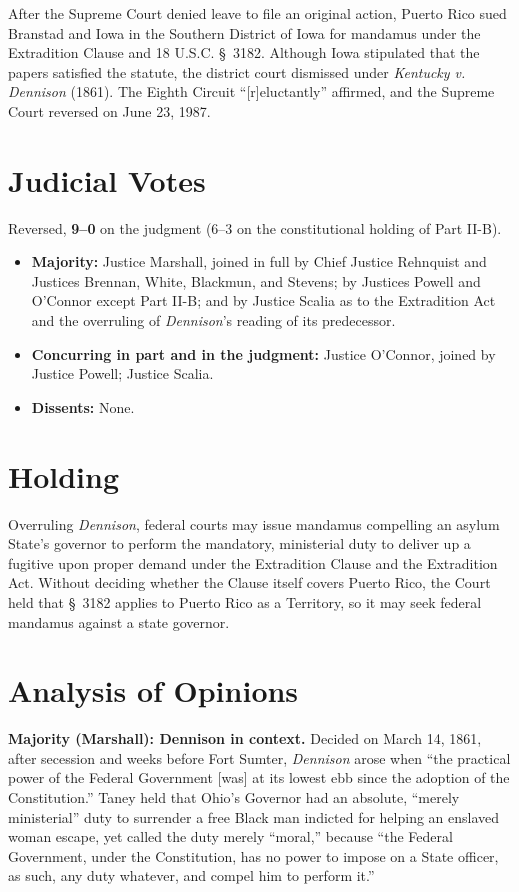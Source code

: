 \documentclass[12pt]{article}
\begin{document}
After the Supreme Court denied leave to file an original action, Puerto Rico sued Branstad and Iowa in the Southern District of Iowa for mandamus under the Extradition Clause and 18 U.S.C. \S~3182. Although Iowa stipulated that the papers satisfied the statute, the district court dismissed under \textit{Kentucky v. Dennison} (1861). The Eighth Circuit ``[r]eluctantly'' affirmed, and the Supreme Court reversed on June 23, 1987.

\section{Judicial Votes}

Reversed, \textbf{9--0} on the judgment (6--3 on the constitutional holding of Part II-B).
\begin{itemize}
\item \textbf{Majority:} Justice Marshall, joined in full by Chief Justice Rehnquist and Justices Brennan, White, Blackmun, and Stevens; by Justices Powell and O'Connor except Part II-B; and by Justice Scalia as to the Extradition Act and the overruling of \textit{Dennison}'s reading of its predecessor.
\item \textbf{Concurring in part and in the judgment:} Justice O'Connor, joined by Justice Powell; Justice Scalia.
\item \textbf{Dissents:} None.
\end{itemize}

\section{Holding}

Overruling \textit{Dennison}, federal courts may issue mandamus compelling an asylum State's governor to perform the mandatory, ministerial duty to deliver up a fugitive upon proper demand under the Extradition Clause and the Extradition Act. Without deciding whether the Clause itself covers Puerto Rico, the Court held that \S~3182 applies to Puerto Rico as a Territory, so it may seek federal mandamus against a state governor.

\section{Analysis of Opinions}

\textbf{Majority (Marshall): Dennison in context.} Decided on March 14, 1861, after secession and weeks before Fort Sumter, \textit{Dennison} arose when ``the practical power of the Federal Government [was] at its lowest ebb since the adoption of the Constitution.'' Taney held that Ohio's Governor had an absolute, ``merely ministerial'' duty to surrender a free Black man indicted for helping an enslaved woman escape, yet called the duty merely ``moral,'' because ``the Federal Government, under the Constitution, has no power to impose on a State officer, as such, any duty whatever, and compel him to perform it.''
\end{document}
